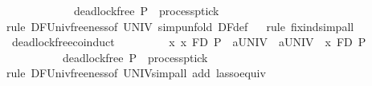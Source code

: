 \begin{isabellebody}
\ \ \ \ \ \ \ \ \ \ \ {\isasymLongrightarrow}\ deadlock{\isacharunderscore}{\kern0pt}free\ {\isacharparenleft}{\kern0pt}P{\isacharcolon}{\kern0pt}{\isacharcolon}{\kern0pt}{\isacharparenleft}{\kern0pt}{\isacharprime}{\kern0pt}{\isasymalpha}{\isacharcomma}{\kern0pt}\ {\isacharprime}{\kern0pt}{\isasymdelta}{\isacharparenright}{\kern0pt}\ process\isactrlsub p\isactrlsub t\isactrlsub i\isactrlsub c\isactrlsub k{\isacharparenright}{\kern0pt}{\isacartoucheclose}\isanewline
%
\isadelimproof
\ \ %
\endisadelimproof
%
\isatagproof
{}\isamarkupfalse%
{\isacharparenleft}{\kern0pt}rule\ DF{\isacharunderscore}{\kern0pt}Univ{\isacharunderscore}{\kern0pt}freeness{\isacharbrackleft}{\kern0pt}of\ UNIV{\isacharbrackright}{\kern0pt}{\isacharcomma}{\kern0pt}\ simp{\isacharcomma}{\kern0pt}unfold\ DF{\isacharunderscore}{\kern0pt}def{\isacharparenright}{\kern0pt}\isanewline
\ \ \isamarkupfalse%
{\isacharparenleft}{\kern0pt}rule\ fix{\isacharunderscore}{\kern0pt}ind{\isacharparenright}{\kern0pt}{\isacharparenleft}{\kern0pt}simp{\isacharunderscore}{\kern0pt}all{\isacharparenright}{\kern0pt}%
\endisatagproof
{\isafoldproof}%
%
\isadelimproof
\isanewline
%
\endisadelimproof
\ \isanewline
{}\isamarkupfalse%
\ deadlock{\isacharunderscore}{\kern0pt}free{\isacharunderscore}{\kern0pt}{}{\isacharunderscore}{\kern0pt}coinduct\ {\isacharcolon}{\kern0pt}\isanewline
\ \ \ \ \ \ \ {\isacartoucheopen}\ {\isacharparenleft}{\kern0pt}{\isasymAnd}x{\isachardot}{\kern0pt}\ x\ {\isasymsqsubseteq}\isactrlsub F\isactrlsub D\ P\ {\isasymLongrightarrow}\ {\isasymsqinter}a{\isasymin}UNIV\ {\isasymrightarrow}\ {\isasymsqinter}a{\isasymin}UNIV\ {\isasymrightarrow}\ x\ {\isasymsqsubseteq}\isactrlsub F\isactrlsub D\ P{\isacharparenright}{\kern0pt}\isanewline
\ \ \ \ \ \ \ \ \ {\isasymLongrightarrow}\ deadlock{\isacharunderscore}{\kern0pt}free\ {\isacharparenleft}{\kern0pt}P{\isacharcolon}{\kern0pt}{\isacharcolon}{\kern0pt}{\isacharparenleft}{\kern0pt}{\isacharprime}{\kern0pt}{\isasymalpha}{\isacharcomma}{\kern0pt}\ {\isacharprime}{\kern0pt}{\isasymdelta}{\isacharparenright}{\kern0pt}\ process\isactrlsub p\isactrlsub t\isactrlsub i\isactrlsub c\isactrlsub k{\isacharparenright}{\kern0pt}{\isacartoucheclose}\isanewline
%
\isadelimproof
\ \ %
\endisadelimproof
%
\isatagproof
{}\isamarkupfalse%
{\isacharparenleft}{\kern0pt}rule\ DF{\isacharunderscore}{\kern0pt}Univ{\isacharunderscore}{\kern0pt}freeness{\isacharbrackleft}{\kern0pt}of\ UNIV{\isacharbrackright}{\kern0pt}{\isacharcomma}{\kern0pt}simp{\isacharunderscore}{\kern0pt}all\ add{\isacharcolon}{\kern0pt}\ lasso{\isacharunderscore}{\kern0pt}equiv{}{\isacharparenright}{\kern0pt}\isanewline

\end{isabellebody}
